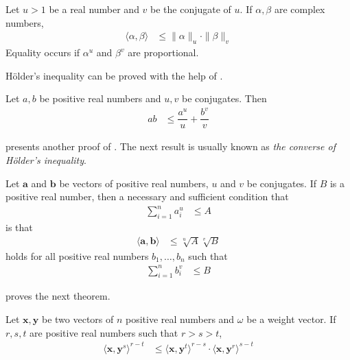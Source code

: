 \documentclass[inequalities.tex]{subfile}
\begin{document}
		\begin{theorem}\label{thm:holder}
			Let $u>1$ be a real number and $v$ be the conjugate of $u$. If $\alpha,\beta$ are complex numbers,
				\begin{align*}
					\langle\alpha,\beta\rangle
						& \leq \|\alpha\|_{u}\cdot\|\beta\|_{v}
				\end{align*}
			Equality occurs if $\alpha^{u}$ and $\beta^{v}$ are proportional.
		\end{theorem}
	H\"{o}lder's inequality can be proved with the help of \textcite{young_1912}.
		\begin{theorem}
			Let $a,b$ be positive real numbers and $u,v$ be conjugates. Then
				\begin{align*}
					ab
						& \leq \dfrac{a^{u}}{u}+\dfrac{b^{v}}{v}
				\end{align*}
		\end{theorem}
	\textcite{razminia_2019} presents another proof of . The next result is usually known as \textit{the converse of H\"{o}lder's inequality}.
		\begin{theorem}
			Let $\mathbf{a}$ and $\mathbf{b}$ be vectors of positive real numbers, $u$ and $v$ be conjugates.  If $B$ is a positive real number, then a necessary and sufficient condition that
				\begin{align*}
					\sum\limits_{i=1}^{n}a_{i}^{u}
						& \leq A
				\end{align*}
			is that
				\begin{align*}
					\langle\mathbf{a},\mathbf{b}\rangle
						& \leq \sqrt[u]{A}\sqrt[v]{B}
				\end{align*}
			holds for all positive real numbers $b_{1},\ldots,b_{n}$ such that
				\begin{align*}
					\sum\limits_{i=1}^{n}b_{i}^{v}
						& \leq B
				\end{align*}
		\end{theorem}
	\textcite{ljapunov_1901} proves the next theorem.
		\begin{theorem}
			Let $\mathbf{x},\mathbf{y}$ be two vectors of $n$ positive real numbers and $\omega$ be a weight vector. If $r,s,t$ are positive real numbers such that $r>s>t$,
				\begin{align*}
					\langle\mathbf{x},\mathbf{y}^{s}\rangle^{r-t}
						& \leq \langle\mathbf{x},\mathbf{y}^{t}\rangle^{r-s}\cdot\langle\mathbf{x},\mathbf{y}^{r}\rangle^{s-t}
				\end{align*}
		\end{theorem}
\end{document}

